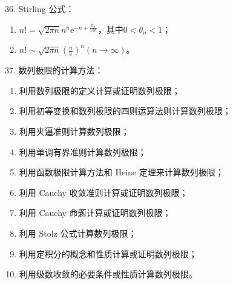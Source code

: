 \documentclass[UTF8]{ctexart}
\theoremstyle{remark}
\begin{document}
	36. Stirling 公式：
	\begin{enumerate}
		\item \(n!=\sqrt{2\pi n}n^n\mathrm{e}^{-n+\frac{\theta_n}{12n}}\)，其中\(0 < \theta_n < 1\)；
		\item \(n!\sim\sqrt{2\pi n}\left(\frac{n}{\mathrm{e}}\right)^n(n\rightarrow\infty)\)。
	\end{enumerate}
	
	37. 数列极限的计算方法：
	\begin{enumerate}
		\item 利用数列极限的定义计算或证明数列极限；
		\item 利用初等变换和数列极限的四则运算法则计算数列极限；
		\item 利用夹逼准则计算数列极限；
		\item 利用单调有界准则计算数列极限；
		\item 利用函数极限计算方法和 Heine 定理来计算数列极限；
		\item 利用 Cauchy 收敛准则计算或证明数列极限；
		 \item 利用 Cauchy 命题计算或证明数列极限；
		\item 利用 Stolz 公式计算数列极限；
		\item 利用定积分的概念和性质计算或证明数列极限；
		\item 利用级数收敛的必要条件或性质计算数列极限。
	\end{enumerate}
	
	
\end{document}
